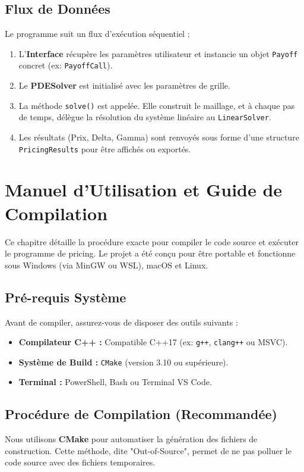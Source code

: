 \documentclass[a4paper,12pt]{article}
\begin{document}
\subsection{Flux de Données}
Le programme suit un flux d'exécution séquentiel :
\begin{enumerate}
    \item L'\textbf{Interface} récupère les paramètres utilisateur et instancie un objet \texttt{Payoff} concret (ex: \texttt{PayoffCall}).
    \item Le \textbf{PDESolver} est initialisé avec les paramètres de grille.
    \item La méthode \texttt{solve()} est appelée. Elle construit le maillage, et à chaque pas de temps, délègue la résolution du système linéaire au \texttt{LinearSolver}.
    \item Les résultats (Prix, Delta, Gamma) sont renvoyés sous forme d'une structure \texttt{PricingResults} pour être affichés ou exportés.
\end{enumerate}
\newpage
\section{Manuel d'Utilisation et Guide de Compilation}

Ce chapitre détaille la procédure exacte pour compiler le code source et exécuter le programme de pricing. Le projet a été conçu pour être portable et fonctionne sous Windows (via MinGW ou WSL), macOS et Linux.

\subsection{Pré-requis Système}
Avant de compiler, assurez-vous de disposer des outils suivants :
\begin{itemize}
    \item \textbf{Compilateur C++ :} Compatible C++17 (ex: \texttt{g++}, \texttt{clang++} ou MSVC).
    \item \textbf{Système de Build :} \texttt{CMake} (version 3.10 ou supérieure).
    \item \textbf{Terminal :} PowerShell, Bash ou Terminal VS Code.
\end{itemize}

\subsection{Procédure de Compilation (Recommandée)}
Nous utilisons \textbf{CMake} pour automatiser la génération des fichiers de construction. Cette méthode, dite "Out-of-Source", permet de ne pas polluer le code source avec des fichiers temporaires.
\end{document}
